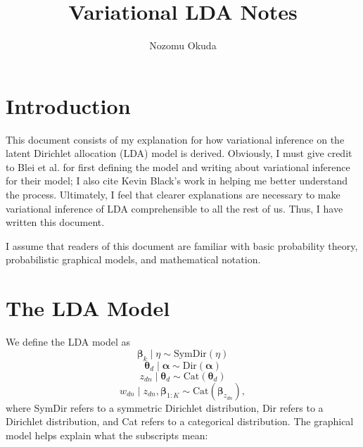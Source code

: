 \documentclass[12pt]{article}
\title{Variational LDA Notes}
\author{Nozomu Okuda}
\begin{document}
\maketitle

\section{Introduction}

This document consists of my explanation for how variational inference on the
latent Dirichlet allocation (LDA) model is derived.  Obviously, I must give
credit to Blei et al.\@ \autocite{Blei:2003:LDA} for first defining the model
and writing about variational inference for their model; I also cite Kevin
Black's work \autocite{kb} in helping me better understand the process.
Ultimately, I feel that clearer explanations are necessary to make variational
inference of LDA comprehensible to all the rest of us.  Thus, I have written
this document.

I assume that readers of this document are familiar with basic probability
theory, probabilistic graphical models, and mathematical notation.

\section{The LDA Model}

We define the LDA model as
\begin{equation}
    \bm{\beta}_{k} \mid \eta \sim \text{SymDir}(\eta)
\end{equation}
\begin{equation}
    \bm{\theta}_{d} \mid \bm{\alpha} \sim \text{Dir}(\bm{\alpha})
\end{equation}
\begin{equation}
    z_{dn} \mid \bm{\theta}_{d} \sim \text{Cat}(\bm{\theta}_{d})
\end{equation}
\begin{equation}
    w_{dn} \mid z_{dn}, \bm{\beta}_{1:K} \sim \text{Cat}(\bm{\beta}_{z_{dn}}),
\end{equation}
where SymDir refers to a symmetric Dirichlet distribution, Dir refers to a
Dirichlet distribution, and Cat refers to a categorical distribution.  The
graphical model helps explain what the subscripts mean:
\end{document}

